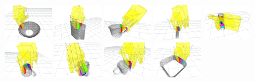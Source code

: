 \begin{figure}[t]
\includegraphics[width=0.19\textwidth]{images/contact-viewall1}
\includegraphics[width=0.19\textwidth]{images/contact-viewall2}
\includegraphics[width=0.19\textwidth]{images/contact-viewall3}
\includegraphics[width=0.19\textwidth]{images/contact-viewall4}
\includegraphics[width=0.19\textwidth]{images/contact-viewall5}\\
\includegraphics[width=0.19\textwidth]{images/contact-viewall6}
\includegraphics[width=0.19\textwidth]{images/contact-viewall7}
\includegraphics[width=0.19\textwidth]{images/contact-viewall8}
\includegraphics[width=0.19\textwidth]{images/contact-viewall9}

\end{figure}
